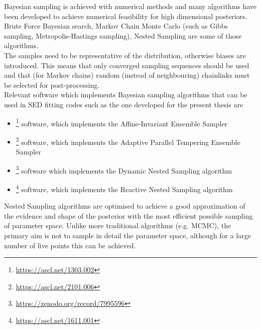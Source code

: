 Bayesian sampling is achieved with numerical methods and many algorithms have been developed to achieve numerical feasibility for high dimensional posteriors. Brute Force Bayesian search, Markov Chain Monte Carlo (such as Gibbs sampling, Metropolis-Hastings sampling), Nested Sampling are some of those algorithms. \\
The samples need to be representative of the distribution, otherwise biases are introduced. This means that only converged sampling sequences should be used and that (for Markov chains) random (instead of neighbouring) chainlinks must be selected for post-processing.\\
Relevant software which implements Bayesian sampling algorithms that can be used in SED fitting codes such as the one developed for the present thesis are
\begin{itemize}
    \item {}\footnote{\url{https://ascl.net/1303.002}} software\cite{emcee2013}, which implements the Affine-Invariant Ensemble Sampler\cite{EnsSampl_2010}
    \item {}\footnote{\url{https://ascl.net/2101.006}} software\cite{ptemcee2016}, which implements the Adaptive Parallel Tempering Ensemble Sampler\cite{ParalTemp_2014}\cite{ParalTemp_2005}
    \item {}\footnote{\url{https://zenodo.org/record/7995596}} software\cite{Dynesty2020} which implements the Dynamic Nested Sampling algorithm\cite{Higson2019}
    \item {}\footnote{\url{https://ascl.net/1611.001}} software\cite{ultranest2021}, which implements the Reactive Nested Sampling algorithm\cite{NestSample_2016}\cite{NestSample_2019}
\end{itemize}
Nested Sampling algorithms are optimised to achieve a good approximation of the evidence and shape of the posterior with the most efficient possible sampling of parameter space. Unlike more traditional algorithms (e.g. MCMC), the primary aim is not to sample in detail the parameter space, although for a large number of live points this can be achieved.



